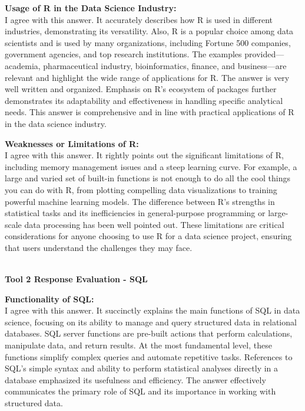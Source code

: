 \documentclass[a4paper, 11pt]{report}
\begin{document}
\textbf{Usage of R in the Data Science Industry:} \\
\noindent I agree with this answer. It accurately describes how R is used in different industries, demonstrating its versatility. Also, R is a popular choice among data scientists and is used by many organizations, including Fortune 500 companies, government agencies, and top research institutions.\cite{Linkedin} The examples provided—academia, pharmaceutical industry, bioinformatics, finance, and business—are relevant and highlight the wide range of applications for R. The answer is very well written and organized. Emphasis on R's ecosystem of packages further demonstrates its adaptability and effectiveness in handling specific analytical needs. This answer is comprehensive and in line with practical applications of R in the data science industry.

\textbf{Weaknesses or Limitations of R:} \\
\noindent I agree with this answer. It rightly points out the significant limitations of R, including memory management issues and a steep learning curve. For example, a large and varied set of built-in functions is not enough to do all the cool things you can do with R, from plotting compelling data visualizations to training powerful machine learning models.\cite{DataCamp} The difference between R's strengths in statistical tasks and its inefficiencies in general-purpose programming or large-scale data processing has been well pointed out. These limitations are critical considerations for anyone choosing to use R for a data science project, ensuring that users understand the challenges they may face.

\vspace{\baselineskip}\\
\noindent \textbf{\large{Tool 2 Response Evaluation - SQL}}

\textbf{Functionality of SQL:} \\
\noindent I agree with this answer. It succinctly explains the main functions of SQL in data science, focusing on its ability to manage and query structured data in relational databases. SQL server functions are pre-built actions that perform calculations, manipulate data, and return results. At the most fundamental level, these functions simplify complex queries and automate repetitive tasks.\cite{blogs} References to SQL's simple syntax and ability to perform statistical analyses directly in a database emphasized its usefulness and efficiency. The answer effectively communicates the primary role of SQL and its importance in working with structured data.
\end{document}
